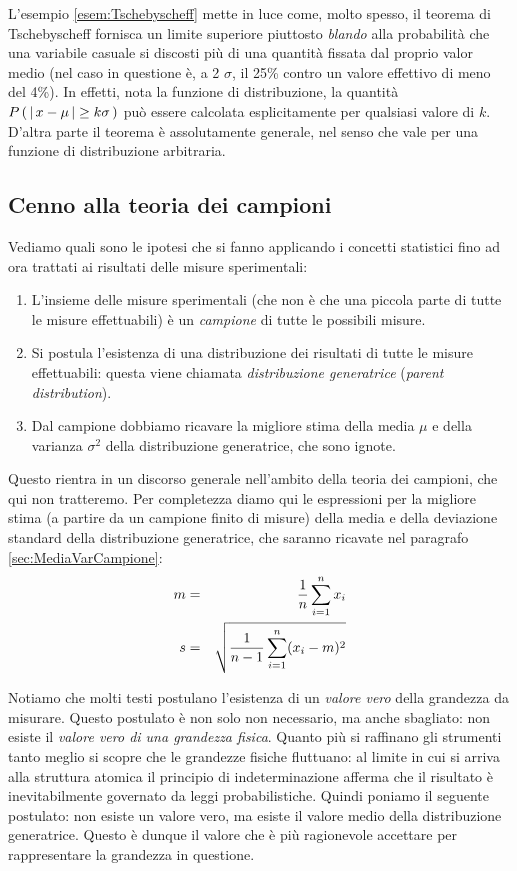 \noindent L'esempio \ref{esem:Tschebyscheff} mette in luce come, molto
spesso, il teorema di Tschebyscheff fornisca un limite superiore
piuttosto {\itshape blando} alla probabilit\`a che una variabile casuale
si discosti pi\`u di una quantit\`a fissata dal proprio valor medio
(nel caso in questione \`e, a 2 $\sigma$, il 25\% contro un valore effettivo
di meno del 4\%).
In effetti, nota la funzione di distribuzione, la quantit\`a
$\prob{\abs{x-\mu} \ge k\sigma}$ pu\`o essere calcolata esplicitamente
per qualsiasi valore di $k$.
D'altra parte il teorema \`e assolutamente generale, nel senso che vale
per una funzione di distribuzione arbitraria.


\subsection{Cenno alla teoria dei campioni}
Vediamo quali sono le ipotesi che si fanno applicando i concetti statistici
fino ad ora trattati ai risultati delle misure sperimentali:
\begin{enumerate}
\item{
L'insieme delle misure sperimentali (che non \`e che una piccola parte di
tutte le misure effettuabili) \`e un {\itshape campione} di tutte le possibili
misure.
}
\item{
Si postula l'esistenza di una distribuzione dei risultati di tutte le misure
effettuabili: questa viene chiamata \emph{distribuzione generatrice}
(\emph{parent distribution}).
}
\item{Dal campione dobbiamo ricavare la migliore stima della media $\mu$ e
della varianza $\sigma^2$ della distribuzione generatrice, che sono ignote.
}
\end{enumerate}
Questo rientra in un discorso generale nell'ambito della teoria dei
campioni, che qui non tratteremo.
Per completezza diamo qui le espressioni per la migliore stima
(a partire da un campione finito di misure) della media e della deviazione
standard della distribuzione generatrice, che saranno ricavate nel paragrafo
\ref{sec:MediaVarCampione}:
\begin{eqnarray*}
m &=& \frac{1}{n}\dsum{x_i}{i}{1}{n}\\
s &=& \sqrt{\frac{1}{n-1}\dsum{(x_i - m)^2}{i}{1}{n}}
\end{eqnarray*}


Notiamo che molti testi postulano l'esistenza di un {\itshape valore vero}
della grandezza da misurare. Questo postulato \`e non solo non necessario,
ma anche sbagliato: non esiste il {\itshape valore vero di una grandezza 
fisica}.
Quanto pi\`u si raffinano gli strumenti tanto meglio si scopre che le
grandezze fisiche fluttuano: al limite in cui si arriva alla struttura atomica
il principio di indeterminazione afferma che il risultato \`e inevitabilmente
governato da leggi probabilistiche. Quindi poniamo il seguente postulato:
non esiste un valore vero, ma esiste il valore medio della distribuzione
generatrice.
Questo  \`e dunque il valore che \`e pi\`u ragionevole accettare per
rappresentare la grandezza in questione.
